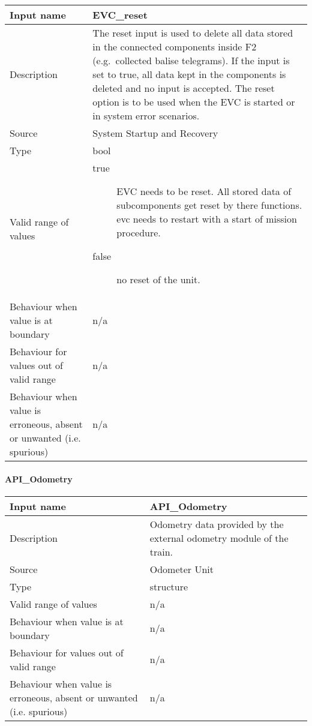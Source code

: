 \begin{longtable}{p{}p{}}
\toprule
Input name				& EVC\_reset \\
\midrule
Description				&  The reset input is used to delete all data stored in the connected components inside F2 (e.g.~collected balise telegrams). If the input is set to true, all data kept in the components is deleted and no input is accepted. The reset option is to be used when the EVC is started or in system error scenarios. \\
\midrule
Source					& System Startup and Recovery\\ 
\midrule
Type					& bool \\
\midrule
Valid range of values	&
\begin{description}
\item [true] EVC needs to be reset. All stored data of subcomponents get reset by there functions. evc needs to restart with a start of mission procedure.
\item [false] no reset of the unit.
\end{description}
\\
\midrule
Behaviour when value is at boundary	& n/a \\
\midrule
Behaviour for values out of valid range	& n/a \\
\midrule
Behaviour when value is erroneous, absent or unwanted (i.e. spurious) &n/a \\
\bottomrule
\end{longtable}

\paragraph{API\_Odometry}

\begin{longtable}{p{}p{}}
\toprule
Input name				& API\_Odometry \\
\midrule
Description				& Odometry data provided by the external odometry module of the train. \\
\midrule
Source					& Odometer Unit\\ 
\midrule
Type					& structure \\
\midrule
Valid range of values	& n/a \\
\midrule
Behaviour when value is at boundary	& n/a \\
\midrule
Behaviour for values out of valid range	& n/a \\
\midrule
Behaviour when value is erroneous, absent or unwanted (i.e. spurious) & n/a \\
\bottomrule
\end{longtable}

